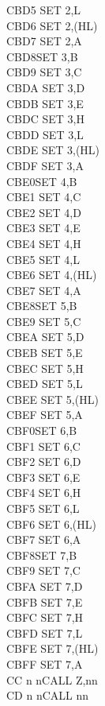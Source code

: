 \documentclass[oneside,a4paper]{book}
\begin{document}
\begin{multicols}{3}
{\begin{tabbing}
CBD5\> 	SET 2,L\\
CBD6\> 	SET 2,(HL)\\
CBD7\> 	SET 2,A\\
CBD8\>SET 3,B\\
CBD9\> 	SET 3,C\\
CBDA\> 	SET 3,D\\
CBDB\> 	SET 3,E\\
CBDC\> 	SET 3,H\\
CBDD\> 	SET 3,L\\
CBDE\> 	SET 3,(HL)\\
CBDF\> 	SET 3,A\\
CBE0\>SET 4,B\\
CBE1\> 	SET 4,C\\
CBE2\> 	SET 4,D\\
CBE3\> 	SET 4,E\\
CBE4\> 	SET 4,H\\
CBE5\> 	SET 4,L\\
CBE6\> 	SET 4,(HL)\\
CBE7\> 	SET 4,A\\
CBE8\>SET 5,B\\
CBE9\> 	SET 5,C\\
CBEA\> 	SET 5,D\\
CBEB\> 	SET 5,E\\
CBEC\> 	SET 5,H\\
CBED\> 	SET 5,L\\
CBEE\> 	SET 5,(HL)\\
CBEF\> 	SET 5,A\\
CBF0\>SET 6,B\\
CBF1\> 	SET 6,C\\
CBF2\> 	SET 6,D\\
CBF3\> 	SET 6,E\\
CBF4\> 	SET 6,H\\
CBF5\> 	SET 6,L\\
CBF6\> 	SET 6,(HL)\\
CBF7\> 	SET 6,A\\
CBF8\>SET 7,B\\
CBF9\> 	SET 7,C\\
CBFA\> 	SET 7,D\\
CBFB\> 	SET 7,E\\
CBFC\> 	SET 7,H\\
CBFD\> 	SET 7,L\\
CBFE\> 	SET 7,(HL)\\
CBFF\> 	SET 7,A\\
CC n n\>CALL Z,nn\\
CD n n\>CALL nn\\

\end{tabbing}}
\end{multicols}
\end{document}
